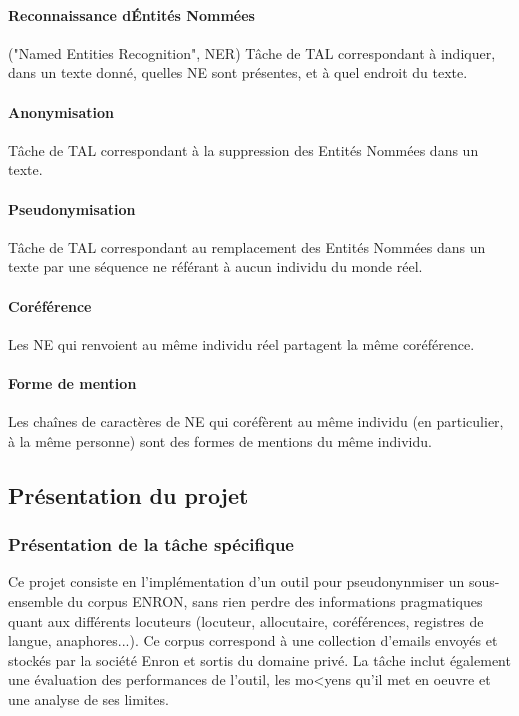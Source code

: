 \documentclass{article}
\begin{document}
\paragraph{Reconnaissance d\'Entités Nommées} ("Named Entities Recognition", NER) Tâche de TAL correspondant à indiquer, dans un texte donné, quelles NE sont présentes, et à quel endroit du texte.
\paragraph{Anonymisation} Tâche de TAL correspondant à la suppression des Entités Nommées dans un texte.
\paragraph{Pseudonymisation} Tâche de TAL correspondant au remplacement des Entités Nommées dans un texte par une séquence ne référant à aucun individu du monde réel.
\paragraph{Coréférence} Les NE qui renvoient au même individu réel partagent la même coréférence. 
\paragraph{Forme de mention} Les chaînes de caractères de NE qui coréfèrent au même individu (en particulier, à la même personne) sont des formes de mentions du même individu.

\subsection{Présentation du projet}
\subsubsection{Présentation de la tâche spécifique}
\par
Ce projet consiste en l'implémentation d'un outil pour pseudonynmiser un sous-ensemble du corpus ENRON, sans rien perdre des informations pragmatiques quant aux différents locuteurs (locuteur, allocutaire, coréférences, registres de langue, anaphores...).
Ce corpus correspond à une collection d'emails envoyés et stockés par la société Enron et sortis du domaine privé.
La tâche inclut également une évaluation des performances de l'outil, les mo<yens qu'il met en oeuvre et une analyse de ses limites.
\end{document}

